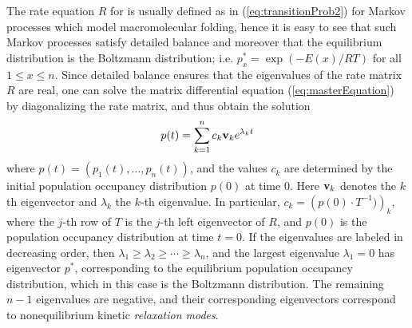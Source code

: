 The rate equation $R$ for is usually defined
as in (\ref{eq:transitionProb2}) for
Markov processes which model macromolecular folding,
hence it is easy to see that
such Markov processes satisfy detailed balance and moreover that
the equilibrium distribution is the
Boltzmann distribution; i.e.  $p^*_x = \exp(-E(x)/RT)$ for
all $1 \leq x \leq n$.
Since detailed balance ensures that the eigenvalues of the rate matrix $R$ are
real, one can solve the matrix differential equation
(\ref{eq:masterEquation}) by diagonalizing the rate matrix, and thus obtain
the solution
\begin{eqnarray}
\label{eq:populationOccupancyEquation}
p(t) = \sum_{k=1}^n c_k {\bf v}_k e^{\lambda_k t}
\end{eqnarray}
where $p(t) = (p_1(t),\ldots,p_n(t))$, and the
values $c_k$ are determined by the initial population occupancy
distribution $p(0)$ at time $0$. Here
${\bf v}_k$ denotes the $k$th eigenvector and
$\lambda_k$ the $k$-th eigenvalue. In particular,
$c_k = \left(p(0) \cdot T^{-1})\right)_k$, where the $j$-th row of $T$
is the $j$-th left eigenvector of $R$,
and $p(0)$ is the population occupancy distribution
at time $t=0$. If the eigenvalues are labeled in decreasing
order, then $\lambda_1 \geq \lambda_2 \geq \cdots \geq \lambda_n$,
and the largest eigenvalue $\lambda_1=0$ has eigenvector $p^*$, corresponding
to the equilibrium population occupancy distribution, which in this case
is the Boltzmann distribution. The
remaining $n-1$ eigenvalues are negative, and their corresponding eigenvectors
correspond to nonequilibrium kinetic {\em relaxation modes}.

